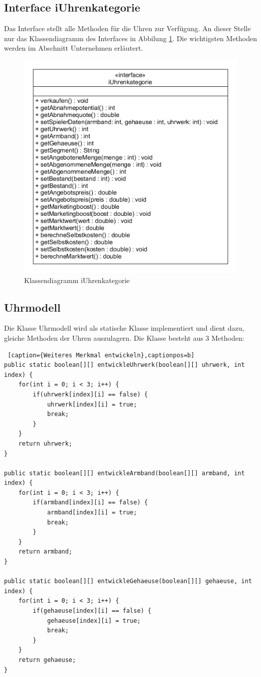 \subsection{Interface iUhrenkategorie}
Das Interface stellt alle Methoden für die Uhren zur Verfügung. An dieser Stelle nur das Klassendiagramm des Interfaces in Abbilung \ref{fig:abb3}. Die wichtigsten Methoden werden im Abschnitt Unternehmen erläutert.

\begin{figure}[!h]
	\centering
	\includegraphics[scale=0.7]{img/iUhrenkategorie.png} 
	\caption{Klassendiagramm iUhrenkategorie} \label{fig:abb3}
\end{figure}

\subsection{Uhrmodell}
Die Klasse Uhrmodell wird als statische Klasse implementiert und dient dazu, gleiche Methoden der Uhren auszulagern. Die Klasse besteht aus 3 Methoden: 

\lstset{language=Java}
\begin{lstlisting} [caption={Weiteres Merkmal entwickeln},captionpos=b]
public static boolean[][] entwickleUhrwerk(boolean[][] uhrwerk, int index) {
	for(int i = 0; i < 3; i++) {
		if(uhrwerk[index][i] == false) {
			uhrwerk[index][i] = true;
			break;
		}
	}
	return uhrwerk;
}

public static boolean[][] entwickleArmband(boolean[][] armband, int index) {
	for(int i = 0; i < 3; i++) {
		if(armband[index][i] == false) {
			armband[index][i] = true;
			break;
		}
	}
	return armband;
}

public static boolean[][] entwickleGehaeuse(boolean[][] gehaeuse, int index) {
	for(int i = 0; i < 3; i++) {
		if(gehaeuse[index][i] == false) {
			gehaeuse[index][i] = true;
			break;
		}
	}
	return gehaeuse;
}	
\end{lstlisting}

